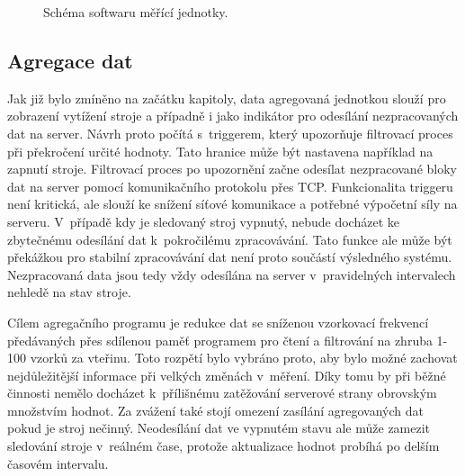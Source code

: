 \begin{figure}[h]
  \centering
  \caption{Schéma softwaru měřící jednotky.}\label{pic:unit_design}
\end{figure}

\subsection{Agregace dat}
Jak již bylo zmíněno na začátku kapitoly, data agregovaná jednotkou slouží pro zobrazení vytížení stroje a případně i jako indikátor pro odesílání nezpracovaných dat na server. Návrh proto počítá s~triggerem, který upozorňuje filtrovací proces při překročení určité hodnoty. Tato hranice může být nastavena například na zapnutí stroje. Filtrovací proces po upozornění začne odesílat nezpracované bloky dat na server pomocí komunikačního protokolu přes TCP. Funkcionalita triggeru není kritická, ale slouží ke snížení síťové komunikace a potřebné výpočetní síly na serveru. V~případě kdy je sledovaný stroj vypnutý, nebude docházet ke zbytečnému odesílání dat k~pokročilému zpracovávání. Tato funkce ale může být překážkou pro stabilní zpracovávání dat není proto součástí výsledného systému. Nezpracovaná data jsou tedy vždy odesílána na server v~pravidelných intervalech nehledě na stav stroje.

Cílem agregačního programu je redukce dat se sníženou vzorkovací frekvencí předávaných přes sdílenou paměť programem pro čtení a filtrování na zhruba 1-100 vzorků za vteřinu. Toto rozpětí bylo vybráno proto, aby bylo možné zachovat nejdůležitější informace při velkých změnách v~měření. Díky tomu by při běžné činnosti nemělo docházet k~přílišnému zatěžování serverové strany obrovským množstvím hodnot. Za zvážení také stojí omezení zasílání agregovaných dat pokud je stroj nečinný. Neodesílání dat ve vypnutém stavu ale může zamezit sledování stroje v~reálném čase, protože aktualizace hodnot probíhá po delším časovém intervalu.

